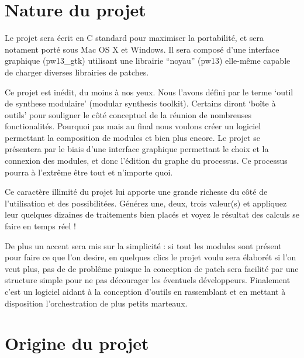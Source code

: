 \documentclass[14pt,a4paper]{article}
\begin{document}
\newpage

\section{Nature du projet}
\par
Le projet sera \'ecrit en C standard pour maximiser la portabilit\'e,
et sera notament port\'e sous Mac OS X et Windows. Il sera compos\'e
 d'une interface graphique (pw13\_gtk) utilisant une librairie ``noyau''
(pw13) elle-m\^eme capable de charger diverses librairies de patches.
\\
\par
Ce projet est in\'edit, du moins \`a nos yeux.
 Nous l'avons d\'efini par le terme `outil de synthese modulaire'
 (modular synthesis toolkit).
 Certains diront `bo\^ite \`a outils' pour souligner le c\^ot\'e
 conceptuel de la r\'eunion de nombreuses fonctionalit\'es. Pourquoi pas
 mais au final nous voulons cr\'eer un logiciel permettant
 la composition de modules et bien plus encore.
 Le projet se pr\'esentera par le
 biais d'une interface graphique permettant le choix et la connexion des
 modules, et donc l'\'edition du graphe du processus.
 Ce processus pourra \`a l'extr\^eme \^etre tout et n'importe quoi.
\\
\par
 Ce caract\`ere illimit\'e du projet lui apporte une grande
 richesse du c\^ot\'e de l'utilisation et des possibilit\'ees.
 G\'en\'erez une, deux, trois valeur(s) et appliquez leur quelques
 dizaines de traitements bien
 plac\'es et voyez le r\'esultat des calculs se faire en temps r\'eel !
\\
\par
 De plus un accent sera mis sur la simplicit\'e : si tout les modules
 sont pr\'esent pour faire ce que l'on desire, en quelques clics
 le projet voulu sera \'elabor\'et si l'on veut plus, pas de de
  probl\^eme puisque la conception de patch sera facilit\'e par
 une structure simple pour ne pas d\'ecourager les \'eventuels d\'eveloppeurs.
 Finalement c'est un logiciel aidant \`a la conception d'outils en
 rassemblant et en mettant \`a disposition l'orchestration de plus
 petits marteaux.\\


\newpage

\section{Origine du projet}
\end{document}
